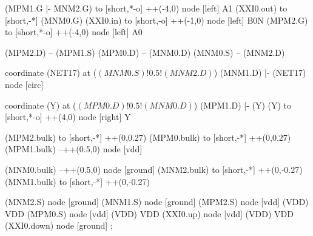 \begin{circuitikz}[american]
	(MPM1.G |- MNM2.G) to [short,*-o] ++(-4,0) node [left] {A1}
	(XXI0.out) to [short,-*] (MNM0.G)
	(XXI0.in) to [short,-o] ++(-1,0) node [left] {B0N}
	(MPM2.G) to [short,*-o] ++(-4,0) node [left] {A0}
	
	(MPM2.D) -- (MPM1.S)
	(MPM0.D) -- (MNM0.D)
	(MNM0.S) -- (MNM2.D)
	
	coordinate (NET17) at ($(MNM0.S)!0.5!(MNM2.D)$)
	(MNM1.D) |- (NET17) node [circ] {}
	
	coordinate (Y) at ($(MPM0.D)!0.5!(MNM0.D)$)
	(MPM1.D) |- (Y)
	(Y) to [short,*-o] ++(4,0) node [right] {Y}
	
	(MPM2.bulk) to [short,-*] ++(0,0.27)
	(MPM0.bulk) to [short,-*] ++(0,0.27)	
	(MPM1.bulk) --++(0.5,0) node [vdd]{}
	
	(MNM0.bulk) --++(0.5,0) node [ground]{}
	(MNM2.bulk) to [short,-*] ++(0,-0.27) 
	(MNM1.bulk) to [short,-*] ++(0,-0.27) 


	(MNM2.S) node [ground] {}
	(MNM1.S) node [ground] {}
	(MPM2.S) node [vdd] (VDD) {VDD}
	(MPM0.S) node [vdd] (VDD) {VDD}
	(XXI0.up) node [vdd] (VDD) {VDD}
	(XXI0.down) node [ground] {}
;

\end{circuitikz}
